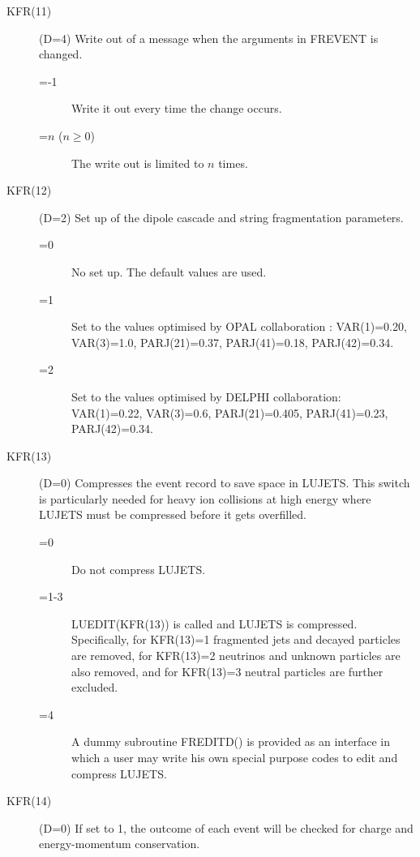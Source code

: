 \begin{itemize}
\begin{description}
\item[KFR(11)] (D=4)
      Write out of a message when the arguments in FREVENT is changed.  
      \begin{description}
      \item[=-1] Write it out every time the change occurs.    
      \item[=$n$ ($n\geq 0$)] The write out is limited to $n$ times.    
      \end{description}
\item[KFR(12)] (D=2) 
        Set up of the dipole cascade and string fragmentation parameters.
      \begin{description}
      \item[=0] No set up.  The default values are used. 
      \item[=1] Set to the values optimised by 
       OPAL collaboration \cite{opal}:
       VAR(1)=0.20, VAR(3)=1.0, PARJ(21)=0.37, PARJ(41)=0.18, PARJ(42)=0.34.  
      \item[=2] Set to the values optimised by DELPHI collaboration:
       VAR(1)=0.22, VAR(3)=0.6, PARJ(21)=0.405, PARJ(41)=0.23, PARJ(42)=0.34.  
       \end{description}
\item[KFR(13)] (D=0) 
       Compresses the event record to save space in LUJETS.  This switch
       is particularly needed for heavy ion collisions at high energy
       where LUJETS must be compressed before it gets overfilled.  
      \begin{description}
      \item[=0] Do not compress LUJETS.  
      \item[=1-3] LUEDIT(KFR(13)) is called and LUJETS is compressed. 
        Specifically, for KFR(13)=1 fragmented jets and 
        decayed particles are removed, for KFR(13)=2 neutrinos and
        unknown particles are also removed, and for KFR(13)=3
        neutral particles are further excluded.
      \item[=4] A dummy subroutine FREDITD() is provided as an interface
        in which a user may write his own special purpose codes to edit
        and compress LUJETS.    
      \end{description}
\item[KFR(14)] (D=0) 
      If set to 1, the outcome of each event will be checked for  
      charge and energy-momentum conservation.
\vskip 12pt


\end{description}
\end{itemize}
